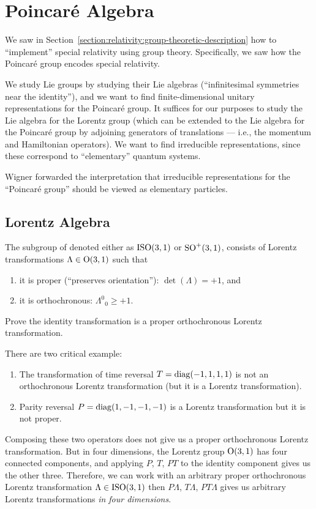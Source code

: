 \section{Poincar\'e Algebra}

We saw in Section~\ref{section:relativity:group-theoretic-description}
how to ``implement'' special relativity using group
theory. Specifically, we saw how the Poincar\'e group encodes special
relativity. 

We study Lie groups by studying their Lie algebras (``infinitesimal
symmetries near the identity''), and we want to find finite-dimensional
unitary representations for the Poincar\'e group. It suffices for our
purposes to study the Lie algebra for the Lorentz group (which can be
extended to the Lie algebra for the Poincar\'e group by adjoining
generators of translations --- i.e., the momentum and Hamiltonian
operators). We want to find irreducible representations, since these
correspond to ``elementary'' quantum systems.

Wigner forwarded the interpretation that irreducible representations for
the ``Poincar\'e group'' should be viewed as elementary
particles.

\subsection{Lorentz Algebra}

\begin{definition}
The subgroup of 
denoted either as $\mathrm{ISO}(3,1)$ or $\operatorname{SO}^{+}(3,1)$, consists of Lorentz
transformations $\Lambda\in\mathrm{O}(3,1)$ such that
\begin{enumerate}
\item it is proper (``preserves orientation''): $\det(\Lambda)=+1$, and
\item it is orthochronous: ${\Lambda^{0}}_{0}\geq+1$.
\end{enumerate}
\end{definition}
\begin{exercise}
Prove the identity transformation is a proper orthochronous Lorentz
transformation. 
\end{exercise}

There are two critical example:
\begin{enumerate}
\item The transformation of time reversal $T=\operatorname{diag}(-1,1,1,1)$ is not an
  orthochronous Lorentz transformation (but it is a Lorentz transformation).
\item Parity reversal $P=\operatorname{diag}(1,-1,-1,-1)$ is a Lorentz transformation
  but it is not proper.
\end{enumerate}
Composing these two operators does not give us a proper orthochronous
Lorentz transformation. But in four dimensions, the Lorentz group
$\mathrm{O}(3,1)$ has four connected components, and applying $P$, $T$, $PT$ to
the identity component gives us the other three. Therefore, we can work
with an arbitrary proper orthochronous Lorentz transformation
$\Lambda\in\mathrm{ISO}(3,1)$ then $P\Lambda$, $T\Lambda$, $PT\Lambda$ gives us
arbitrary Lorentz transformations \emph{in four dimensions}.

